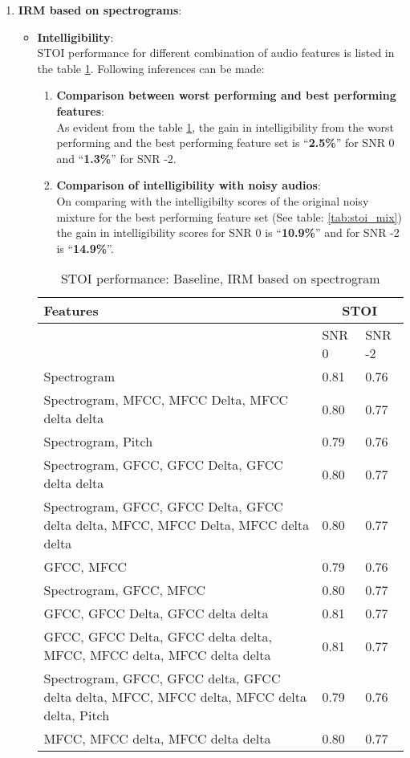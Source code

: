 \begin{enumerate}
\item \textbf{IRM based on spectrograms}:\\
\begin{itemize}
\item \textbf{Intelligibility}:\\
STOI performance for different combination of audio features is listed in the table \ref{tab:dnn_0_stoi}. Following inferences can be made:\\ 
\begin{enumerate}
\item \textbf{Comparison between worst performing and best performing features}:\\
As evident from the table \ref{tab:dnn_0_stoi}, the gain in intelligibility from the worst performing and the best performing feature set is  \enquote{\textbf{2.5\%}} for SNR 0 and \enquote{\textbf{1.3\%}} for SNR -2.\\ 
\item \textbf{Comparison of intelligibility with noisy audios}:\\
On comparing with the intelligibilty scores of the original noisy mixture for the best performing feature set (See table: \ref{tab:stoi_mix}) the gain in intelligibility scores for SNR 0 is \enquote{\textbf{10.9\%}} and for SNR -2 is \enquote{\textbf{14.9\%}}.\\
\end{enumerate}
\begin{table}[!htbp]
\centering
\begin{tabular}{ |p{12cm}|p{1.7cm}|p{1.7cm}|  }
\hline
\textbf{Features} & \multicolumn{2}{|c|}{\textbf{STOI}} \\
\hline
\cellcolor{black} & SNR 0 & SNR -2 \\
\hline
Spectrogram & 0.81	& 0.76\\
\hline
Spectrogram, MFCC, MFCC Delta, MFCC delta delta & 0.80	& 0.77\\
\hline
Spectrogram, Pitch &	0.79 & 0.76\\
\hline
Spectrogram, GFCC, GFCC Delta, GFCC delta delta & 0.80	& 0.77\\
\hline
Spectrogram, GFCC, GFCC Delta, GFCC delta delta, MFCC, MFCC Delta, MFCC delta delta &	0.80 & 0.77\\
\hline
GFCC, MFCC & 0.79 & 0.76\\
\hline
Spectrogram, GFCC, MFCC & 0.80 & 0.77\\
\hline
\rowcolor[HTML]{ADD8E6}GFCC, GFCC Delta, GFCC delta delta & 0.81 & 0.77\\
\hline
GFCC, GFCC Delta, GFCC delta delta, MFCC, MFCC delta, MFCC delta delta &	0.81 & 0.77\\
\hline
Spectrogram, GFCC, GFCC delta, GFCC delta delta, MFCC, MFCC delta, MFCC delta delta, Pitch & 0.79 & 0.76\\
\hline
MFCC, MFCC delta, MFCC delta delta & 0.80 & 0.77\\
\hline
\end{tabular}
\caption{STOI performance: Baseline, IRM based on spectrogram}
\label{tab:dnn_0_stoi}
\end{table}


\end{itemize}
\end{enumerate}
